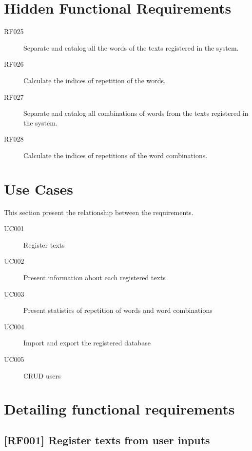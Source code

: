 \documentclass[11pt, twoside, a4paper]{book}
\begin{document}
		\section{Hidden Functional Requirements}
			
			\begin{description}

				\item[RF025] Separate and catalog all the words of the texts registered in the system.
				\item[RF026] Calculate the indices of repetition of the words.
				\item[RF027] Separate and catalog all combinations of words from the texts registered in the system.
				\item[RF028] Calculate the indices of repetitions of the word combinations.

			\end{description}
		
		\section{Use Cases}
			
			This section present the relationship between the requirements.

			\begin{description}

				\item[UC001] Register texts
				\item[UC002] Present information about each registered texts
				\item[UC003] Present statistics of repetition of words and word combinations
				\item[UC004] Import and export the registered database
				\item[UC005] CRUD users
	
			\end{description}
		\section{Detailing functional requirements}
			
			\subsection{[RF001] Register texts from user inputs}
				
\end{document}
